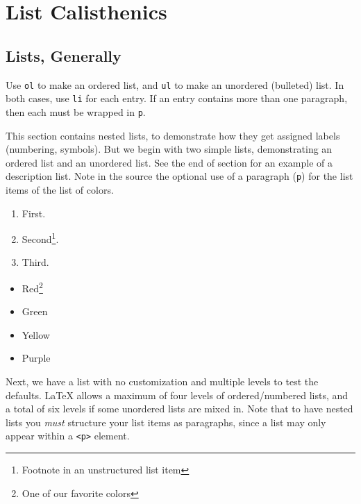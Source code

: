 \documentclass[pdflatex]{sn-jnl}
\theoremstyle{thmstyleone}%
\theoremstyle{thmstyletwo}%
\theoremstyle{thmstylethree}%
\newcommand{\mono}[1]{\texttt{#1}}
\numberwithin{equation}{section}
\begin{document}
\section{List Calisthenics}\label{section-lists}%
%
%
\typeout{************************************************}
\typeout{************************************************}
%
\subsection{Lists, Generally}\label{section-lists-2}%
%
%
%
%
Use \mono{ol} to make an ordered list, and \mono{ul} to make an unordered (bulleted) list. In both cases, use \mono{li} for each entry.  If an entry contains more than one paragraph, then each must be wrapped in \mono{p}. %
\par
This section contains nested lists, to demonstrate how they get assigned labels (numbering, symbols). But we begin with two simple lists, demonstrating an ordered list and an unordered list. See the end of section for an example of a description list. Note in the source the optional use of a paragraph (\mono{p}) for the list items of the list of colors.%
\par
%
\begin{enumerate}
\item{}First.%
\item{}Second\footnote{Footnote in an unstructured list item\label{section-lists-2-8-1-2-1}}.%
\item{}Third.%
\end{enumerate}
%
\begin{itemize}[label=\textbullet]
\item{}Red\footnote{One of our favorite colors\label{section-lists-2-8-2-1-1-1}}%
\item{}Green%
\item{}Yellow%
\item{}Purple%
\end{itemize}
%
\par
Next, we have a list with no customization and multiple levels to test the defaults.  \LaTeX{} allows a maximum of four levels of ordered\slash{}numbered lists, and a total of six levels if some unordered lists are mixed in.  Note that to have nested lists you \emph{must} structure your list items as paragraphs, since a list may only appear within a \mono{<p>} element.%
\end{document}
